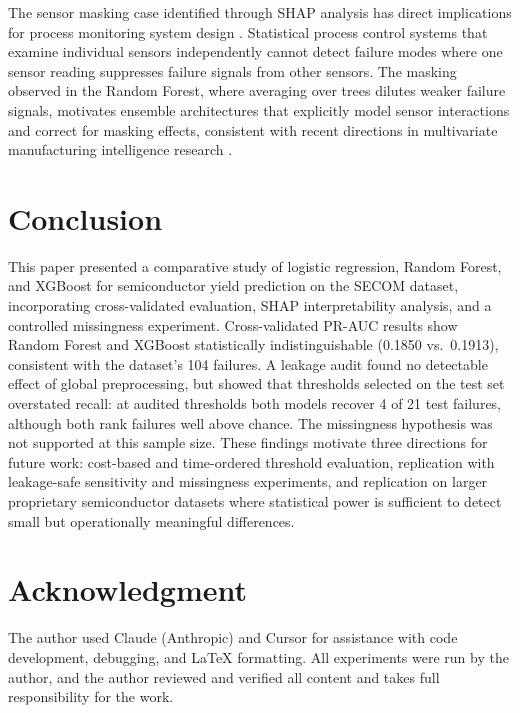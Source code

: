\documentclass[conference]{IEEEtran}
\begin{document}
The sensor masking case identified through SHAP analysis has direct 
implications for process monitoring system design 
\cite{srisailam2025fault}. Statistical process control systems 
that examine individual sensors independently cannot detect failure 
modes where one sensor reading suppresses failure signals from 
other sensors. The masking observed in the Random Forest, where averaging over
trees dilutes weaker failure signals, motivates ensemble
architectures that explicitly model sensor interactions and
correct for masking effects, consistent with recent directions in
multivariate manufacturing intelligence research
\cite{kim2019fault,hsu2021multiple}.

\section{Conclusion}

This paper presented a comparative study of logistic regression, 
Random Forest, and XGBoost for semiconductor yield prediction on 
the SECOM dataset, incorporating cross-validated evaluation, SHAP 
interpretability analysis, and a controlled missingness experiment. 
Cross-validated PR-AUC results show Random Forest and XGBoost
statistically indistinguishable (0.1850 vs.\ 0.1913), consistent
with the dataset's 104 failures. A leakage audit found no
detectable effect of global preprocessing, but showed that
thresholds selected on the test set overstated recall: at audited
thresholds both models recover 4 of 21 test failures, although both
rank failures well above chance. The missingness hypothesis was not
supported at this sample size. These findings motivate three
directions for future work: cost-based and time-ordered threshold
evaluation, replication with leakage-safe sensitivity and
missingness experiments, and replication on larger proprietary
semiconductor datasets where statistical power is sufficient to
detect small but operationally meaningful differences.

\section*{Acknowledgment}
The author used Claude (Anthropic) and Cursor for assistance
with code development, debugging, and LaTeX formatting. All experiments were run by the author, and the author reviewed and verified all content and takes full responsibility for the
work.



\end{document}
